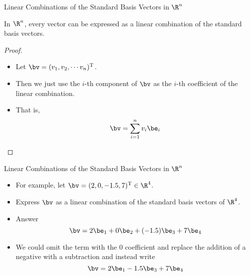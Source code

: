\documentclass{beamer}
\begin{document}
\begin{frame}{Linear Combinations of the Standard Basis Vectors in $\R^n$}

\begin{lemma}
In $\R^n$, every vector can be expressed as a linear combination of the standard
basis vectors.
\end{lemma}

\begin{proof}
\begin{itemize}
\item Let $\bv = (v_1, v_2, \cdots v_n)^{\text{T}}$.
\item Then we just use the $i$-th component of $\bv$ as the $i$-th coefficient
of the linear combination.
\item That is,
$$\bv = \sum _{i=1}^{n} v_i \be_i$$
\end{itemize}
\end{proof}

\end{frame}

\begin{frame}{Linear Combinations of the Standard Basis Vectors in $\R^n$}

\begin{itemize}
\item For example, let $\bv = (2, 0, -1.5, 7)^{\text{T}} \in \R^4$.
\item Express $\bv$ as a linear combination of the standard basis vectors of
$\R^4$.
\item Answer $$\bv = 2 \be_1 + 0 \be_2 + (-1.5) \be_3 + 7 \be_4$$
\item We could omit the term with the 0 coefficient and replace the addition
of a negative with a subtraction and instead write
$$\bv = 2 \be_1 -1.5 \be_3 + 7 \be_4$$
\end{itemize}

\end{frame}
\end{document}
